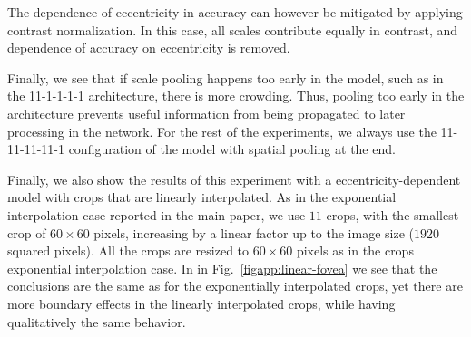 \documentclass{article}
\begin{document}
The dependence of eccentricity  in accuracy can however be mitigated by applying contrast normalization.  In this case, all scales contribute equally in contrast, and dependence of accuracy on eccentricity is removed.

Finally, we see that if scale pooling happens too early in the model, such as in the 11-1-1-1-1 architecture, there is more crowding.  Thus, pooling too early in the architecture prevents useful information from being propagated to later processing in the network.  For the rest of the experiments, we always use the 11-11-11-11-1 configuration of the model with spatial pooling at the end.



Finally, we also show the results of this experiment with a eccentricity-dependent model with crops that are linearly interpolated.
As in the exponential interpolation case reported in the main paper,  we use $11$ crops, with the smallest crop of $60\times 60$ pixels, increasing by a linear factor up to the image size ($1920$ squared pixels). All the crops are resized to $60\times 60$ pixels as in the crops exponential interpolation case. In in Fig.~\ref{figapp:linear-fovea} we see that the conclusions are the same as for the exponentially interpolated crops, yet there are more boundary effects in the  linearly interpolated crops, while having qualitatively the same behavior. 
\end{document}
